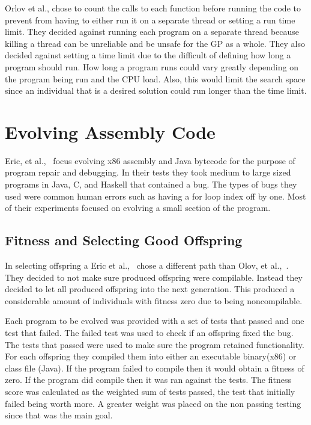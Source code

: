 \documentclass{sig-alternate}
\begin{document}
Orlov et al., chose to count the calls to each function before running the code to prevent from having to either run it on a separate thread or setting a run time limit. They decided against running each program on a separate thread because killing a thread can be unreliable and be unsafe for the GP as a whole. They also decided against setting a time limit due to the difficult of defining how long a program should run. How long a program runs could vary greatly depending on the program being run and the CPU load. Also, this would limit the search space since an individual that is a desired solution could run longer than the time limit.


\section{Evolving Assembly Code}
Eric, et al.,~\cite{Assembly:2010} focus evolving x86 assembly and Java bytecode for the purpose of program repair and debugging. In their tests they took medium to large sized programs in Java, C, and Haskell that contained a bug. The types of bugs they used were common human errors such as having a for loop index off by one. Most of their experiments focused on evolving a small section of the program.
\subsection{Fitness and Selecting Good Offspring } 
In selecting offspring a Eric et al.,~\cite{Assembly:2010} chose a different path than Olov, et al.,~\cite{FINCH:2011}. They decided to not make sure produced offspring were compilable. Instead they decided to let all produced offspring into the next generation. This produced a considerable amount of individuals with fitness zero due to being noncompilable.

Each program to be evolved was provided with a set of tests that passed and one test that failed. The failed test was used to check if an offspring fixed the bug. The tests that passed were used to make sure the program retained functionality. For each offspring they compiled them into either an executable binary(x86) or class file (Java). If the program failed to compile then it would obtain a fitness of zero. If the program did compile then it was ran against the tests. The fitness score was calculated as the weighted sum of tests passed, the test that initially failed being worth more. A greater weight was placed on the non passing testing since that was the main goal.
\end{document}
